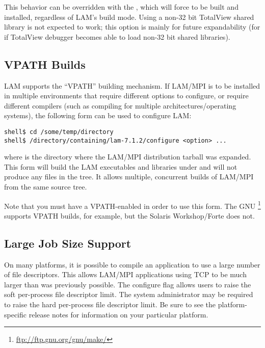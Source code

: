 This behavior can be overridden with the
, which will force
 to be built and installed, regardless of
LAM's build mode.  Using a non-32 bit TotalView shared library is not
expected to work; this option is mainly for future expandability (for
if TotalView debugger becomes able to load non-32 bit shared
libraries).



\subsection{VPATH Builds}

LAM supports the ``VPATH'' building mechanism.  If LAM/MPI is to be
installed in multiple environments that require different options to
configure, or require different compilers (such as compiling for
multiple architectures/operating systems), the following form can be
used to configure LAM:

\lstset{style=lam-cmdline}
\begin{lstlisting}
shell$ cd /some/temp/directory
shell$ /directory/containing/lam-7.1.2/configure <option> ...
\end{lstlisting}

\noindent where  is the directory
where the LAM/MPI distribution tarball was expanded.  This form will
build the LAM executables and libraries under
 and will not produce any files in the
 tree.  It allows multiple,
concurrent builds of LAM/MPI from the same source tree.

Note that you must have a VPATH-enabled  in order to use
this form.  The GNU
\footnote{\url{ftp://ftp.gnu.org/gnu/make/}} supports VPATH
builds, for example, but the Solaris Workshop/Forte  does
not.



\subsection{Large Job Size Support}

On many platforms, it is possible to compile an application to use a
large number of file descriptors.  This allows LAM/MPI applications
using TCP to be much larger than was previously possible.  The
configure flag  allows users to raise the
soft per-process file descriptor limit.  The system administrator may
be required to raise the hard per-process file descriptor limit.  Be
sure to see the platform-specific release notes for information on
your particular platform.



